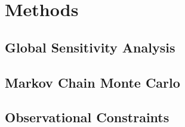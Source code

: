 \documentclass[]{aastex631}
\begin{document}
\section{Methods} \label{sec:methods}

\subsection{Global Sensitivity Analysis}


\subsection{Markov Chain Monte Carlo}



\subsection{Observational Constraints}
\end{document}
